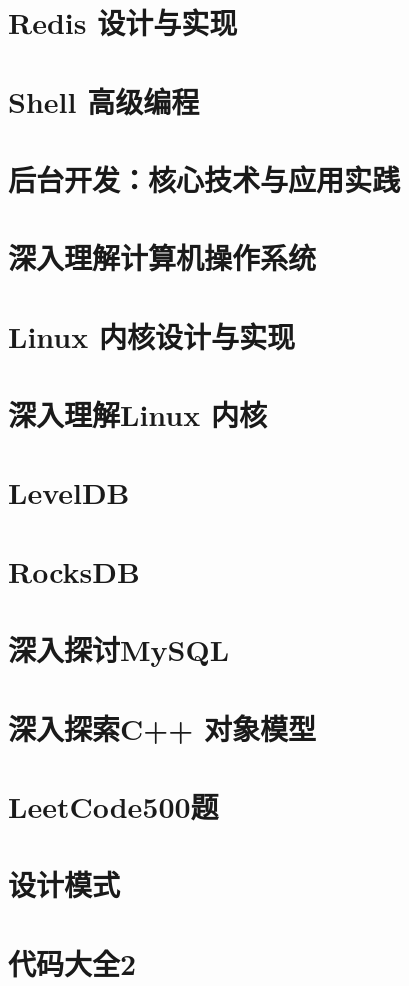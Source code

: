 \documentclass[UTF8,a4paper,12pt]{ctexbook}
\begin{document}
	\section{Redis 设计与实现}
	
	\section{Shell 高级编程}
	
	\section{后台开发：核心技术与应用实践}
	
	\section{深入理解计算机操作系统}
	
	\section{Linux 内核设计与实现}
	
	\section{深入理解Linux 内核}
	
	\section{LevelDB}
	
	\section{RocksDB}
	
	\section{深入探讨MySQL}
	
	\section{深入探索C++ 对象模型}
	
	\section{LeetCode500题}
	
	\section{设计模式}
	
	\section{代码大全2}
	
\end{document}
